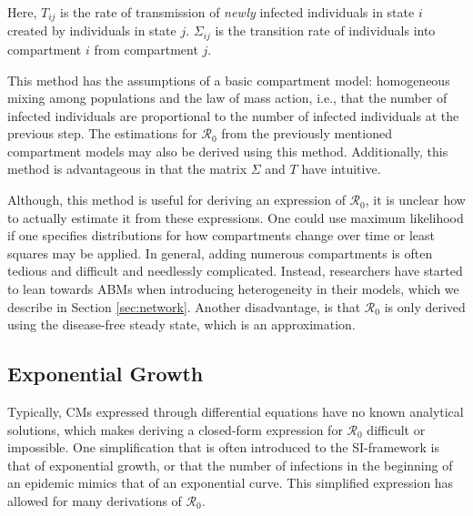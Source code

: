 \documentclass[12pt]{article}
\newcommand{\rr}{\ensuremath{\mathcal{R}_0}}
\begin{document}
Here, $T_{ij}$ is the rate of transmission of \textit{newly} infected individuals in state $i$ created by individuals in state $j$.  $\Sigma_{ij}$ is the transition rate of individuals into compartment $i$ from compartment $j$.

This method has the assumptions of a basic compartment model: homogeneous mixing among populations and the law of mass action, i.e., that the number of infected individuals are proportional to the number of infected individuals at the previous step.  The estimations for $\rr$ from the previously mentioned compartment models may also be derived using this method.  Additionally, this method is advantageous in that the matrix $\Sigma$ and $T$ have intuitive. 

Although, this method is useful for deriving an expression of $\rr$, it is unclear how to actually estimate it from these expressions.  One could use maximum likelihood if one specifies distributions for how compartments change over time or least squares may be applied. In general, adding numerous compartments is often tedious and difficult and needlessly complicated.  Instead, researchers have started to lean towards ABMs when introducing heterogeneity in their models, which we describe in Section \ref{sec:network}.  Another disadvantage, is that $\rr$ is only derived using the disease-free steady state, which is an approximation.  


\subsection{Exponential Growth}\label{sec:exp-growth}
Typically, CMs expressed through differential equations have no known analytical solutions, which makes deriving a closed-form expression for $\rr$ difficult or impossible.  One simplification that is often introduced to the SI-framework is that of exponential growth, or that the number of infections in the beginning of an epidemic mimics that of an exponential curve.  This simplified expression has allowed for many derivations of $\rr$.
\end{document}
